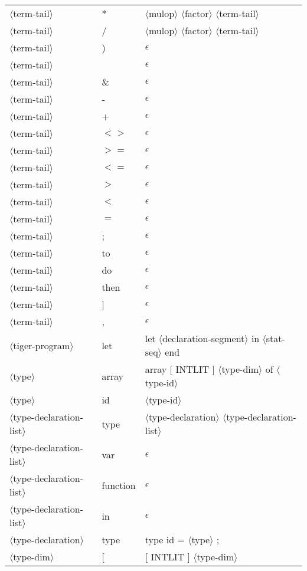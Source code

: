 \documentclass[11pt, fleqn]{article}
\newcommand{\atag}[1]{$\langle$#1$\rangle$}
\begin{document}
\begin{longtable}{l|l|l}
\atag{term-tail}					&	*		&	\atag{mulop} \atag{factor} \atag{term-tail}		\\
\atag{term-tail}					&	/		&	\atag{mulop} \atag{factor} \atag{term-tail}		\\
\atag{term-tail}					&	)		&	$\epsilon$		\\
\atag{term-tail}					&	\textbar		&	$\epsilon$		\\
\atag{term-tail}					&	\&		&	$\epsilon$		\\
\atag{term-tail}					&	-		&	$\epsilon$		\\
\atag{term-tail}					&	+		&	$\epsilon$		\\
\atag{term-tail}					&	$<>$		&	$\epsilon$		\\
\atag{term-tail}					&	$>=$		&	$\epsilon$		\\
\atag{term-tail}					&	$<=$		&	$\epsilon$		\\
\atag{term-tail}					&	$>$		&	$\epsilon$		\\
\atag{term-tail}					&	$<$		&	$\epsilon$		\\
\atag{term-tail}					&	$=$		&	$\epsilon$		\\
\atag{term-tail}					&	;		&	$\epsilon$		\\
\atag{term-tail}					&	to		&	$\epsilon$		\\
\atag{term-tail}					&	do		&	$\epsilon$		\\
\atag{term-tail}					&	then		&	$\epsilon$		\\
\atag{term-tail}					&	]		&	$\epsilon$		\\
\atag{term-tail}					&	,		&	$\epsilon$		\\
\atag{tiger-program}				&	let		&	let \atag{declaration-segment} in \atag{stat-seq} end	\\
\atag{type}						&	array		&	array [ INTLIT ] \atag{type-dim} of \atag{type-id}	\\
\atag{type}						&	id		&	\atag{type-id}	\\
\atag{type-declaration-list}		&	type		&	\atag{type-declaration} \atag{type-declaration-list}	\\
\atag{type-declaration-list}		&	var		&	$\epsilon$	\\
\atag{type-declaration-list}		&	function		&	$\epsilon$\\
\atag{type-declaration-list}		&	in		&	$\epsilon$\\
\atag{type-declaration}			&	type 	&	type id = \atag{type} ;		\\
\atag{type-dim}					&	[		&	[ INTLIT ] \atag{type-dim}	\\

\end{longtable}
\end{document}
